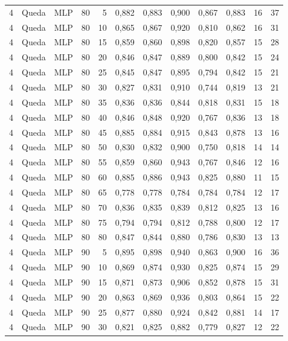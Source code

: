 \begin{longtable}{@{}rllrrrrrrrrr@{}}
4 & Queda & MLP & 80 & 5 & 0,882 & 0,883 & 0,900 & 0,867 & 0,883 & 16 & 37 \\
4 & Queda & MLP & 80 & 10 & 0,865 & 0,867 & 0,920 & 0,810 & 0,862 & 16 & 31 \\
4 & Queda & MLP & 80 & 15 & 0,859 & 0,860 & 0,898 & 0,820 & 0,857 & 15 & 28 \\
4 & Queda & MLP & 80 & 20 & 0,846 & 0,847 & 0,889 & 0,800 & 0,842 & 15 & 24 \\
4 & Queda & MLP & 80 & 25 & 0,845 & 0,847 & 0,895 & 0,794 & 0,842 & 15 & 21 \\
4 & Queda & MLP & 80 & 30 & 0,827 & 0,831 & 0,910 & 0,744 & 0,819 & 13 & 21 \\
4 & Queda & MLP & 80 & 35 & 0,836 & 0,836 & 0,844 & 0,818 & 0,831 & 15 & 18 \\
4 & Queda & MLP & 80 & 40 & 0,846 & 0,848 & 0,920 & 0,767 & 0,836 & 13 & 18 \\
4 & Queda & MLP & 80 & 45 & 0,885 & 0,884 & 0,915 & 0,843 & 0,878 & 13 & 16 \\
4 & Queda & MLP & 80 & 50 & 0,830 & 0,832 & 0,900 & 0,750 & 0,818 & 14 & 14 \\
4 & Queda & MLP & 80 & 55 & 0,859 & 0,860 & 0,943 & 0,767 & 0,846 & 12 & 16 \\
4 & Queda & MLP & 80 & 60 & 0,885 & 0,886 & 0,943 & 0,825 & 0,880 & 11 & 15 \\
4 & Queda & MLP & 80 & 65 & 0,778 & 0,778 & 0,784 & 0,784 & 0,784 & 12 & 17 \\
4 & Queda & MLP & 80 & 70 & 0,836 & 0,835 & 0,839 & 0,812 & 0,825 & 13 & 16 \\
4 & Queda & MLP & 80 & 75 & 0,794 & 0,794 & 0,812 & 0,788 & 0,800 & 12 & 17 \\
4 & Queda & MLP & 80 & 80 & 0,847 & 0,844 & 0,880 & 0,786 & 0,830 & 13 & 13 \\
4 & Queda & MLP & 90 & 5 & 0,895 & 0,898 & 0,940 & 0,863 & 0,900 & 16 & 36 \\
4 & Queda & MLP & 90 & 10 & 0,869 & 0,874 & 0,930 & 0,825 & 0,874 & 15 & 29 \\
4 & Queda & MLP & 90 & 15 & 0,871 & 0,873 & 0,906 & 0,852 & 0,878 & 15 & 31 \\
4 & Queda & MLP & 90 & 20 & 0,863 & 0,869 & 0,936 & 0,803 & 0,864 & 15 & 22 \\
4 & Queda & MLP & 90 & 25 & 0,877 & 0,880 & 0,924 & 0,842 & 0,881 & 14 & 17 \\
4 & Queda & MLP & 90 & 30 & 0,821 & 0,825 & 0,882 & 0,779 & 0,827 & 12 & 22 \\

\end{longtable}
